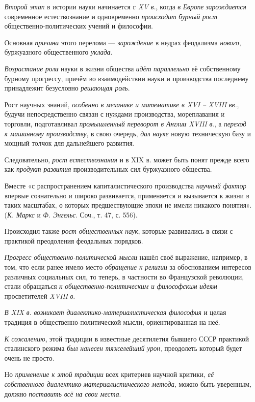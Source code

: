 \documentclass[a4paper,14pt,russian]{extreport}
\begin{document}
\emph{Второй этап} в истории науки начинается \emph{с XV в}., когда \emph{в Европе} \emph{зарождается} современное естествознание и одновременно \emph{происходит бурный рост} общественно-политических учений и философии.

Основная \emph{причина} этого перелома --- \emph{зарождение} в недрах феодализма \emph{нового}, буржуазного общественного \emph{уклада}.

\emph{Возрастание роли} науки в жизни общества \emph{идёт параллельно} её собственному бурному прогрессу, причём во взаимодействии науки и производства последнему принадлежит безусловно \emph{решающая роль}.

Рост научных знаний, \emph{особенно в механике и математике в XVI -- XVIII вв.}\textsc{,} будучи непосредственно связан с нуждами производства, мореплавания и торговли, подготавливал \emph{промышленный переворот в Англии XVIII в}., а \emph{переход к машинному производству}, в свою очередь, \emph{дал науке} новую техническую базу и мощный толчок для дальнейшего развития.

Следовательно, \emph{рост естествознания} и в XIX в. может быть понят прежде всего как \emph{продукт развития} производительных сил буржуазного общества.

Вместе «с распространением капиталистического производства \emph{научный фактор} впервые сознательно и широко развивается, применяется и вызывается к жизни в таких масштабах, о которых предшествующие эпохи не имели никакого понятия». (\emph{К. Маркс} и \emph{Ф. Энгельс}. Соч., т. 47, с. 556).

Происходил также \emph{рост общественных наук}, которые развивались в связи с практикой преодоления феодальных порядков.

\emph{Прогресс общественно-политической мысли} нашёл своё выражение, например, в том, что если ранее имело место \emph{обращение к религии} за обоснованием интересов различных социальных сил, то теперь, в частности во Французской революции, стали обращаться \emph{к общественно-политическим и философским идеям} просветителей \emph{XVIII} \emph{в.}

\emph{В XIX в. возникает диалектико-материалистическая философия} и целая традиция в общественно-политической мысли, ориентированная на неё.

\emph{К сожалению}, этой традиции в известные десятилетия бывшего СССР практикой сталинского режима \emph{был нанесен тяжелейший урон}, преодолеть который будет очень не просто.

Но \emph{применение к этой традиции} всех критериев научной критики, \emph{её собственного диалектико-материалистического метода}, можно быть уверенным, должно \emph{поставить всё на свои места}.
\end{document}
